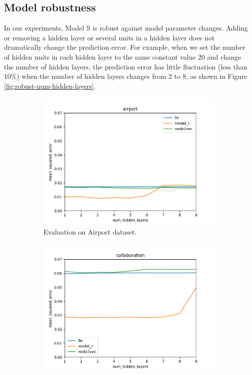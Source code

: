 \documentclass[12pt]{WSUThesis}
\theoremstyle{definition}
\begin{document}
\subsection{Model robustness}
In our experiments, Model S is robust against model parameter changes.
Adding or removing a hidden layer or several units in a hidden layer does not dramatically change the prediction error.
For example, when we set the number of hidden units in each hidden layer to the same constant value 20 and change the number of hidden layers,
the prediction error has little fluctuation (less than 10\%) when the number of hidden layers changes from 2 to 8,
as shown in Figure \ref{fig:robust-num-hidden-layers}.
\begin{figure}[ht] \centering
	\begin{subfigure}{0.49 \linewidth}
		\includegraphics[width=\linewidth]{num_hidden_layers_airport}
		\caption{Evaluation on Airport dataset.}
	\end{subfigure}
	\begin{subfigure}{0.49 \linewidth}
		\includegraphics[width=\linewidth]{num_hidden_layers_collaboration}

\end{subfigure}
\end{figure}
\end{document}
